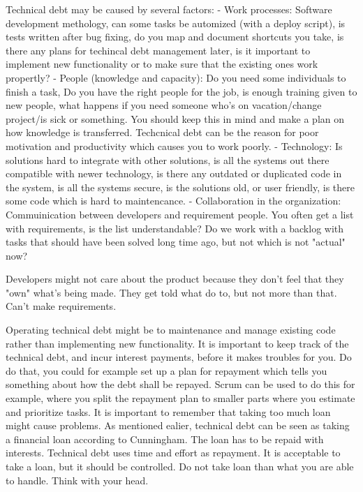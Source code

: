 Technical debt may be caused by several factors:
- Work processes: Software development methology, can some tasks be automized (with a deploy script), is tests written after bug fixing, do you map and document shortcuts you take, is there any plans for techincal debt management later, is it important to implement new functionality or to make sure that the existing ones work propertly?
- People (knowledge and capacity): Do you need some individuals to finish a task, Do you have the right people for the job, is enough training given to new people, what happens if you need someone who's on vacation/change project/is sick or something. You should keep this in mind and make a plan on how knowledge is transferred. Techcnical debt can be the reason for poor motivation and productivity which causes you to work poorly. 
- Technology: Is solutions hard to integrate with other solutions, is all the systems out there compatible with newer technology, is there any outdated or duplicated code in the system, is all the systems secure, is the solutions old, or user friendly, is there some code which is hard to maintencance. 
- Collaboration in the organization: Commuinication between developers and requirement people. You often get a list with requirements, is the list understandable? Do we work with a backlog with tasks that should have been solved long time ago, but not which is not "actual" now?

Developers might not care about the product because they don't feel that they "own" what's being made. They get told what do to, but not more than that. Can't make requirements.


Operating technical debt might be to maintenance and manage existing code rather than implementing new functionality. It is important to keep track of the technical debt, and incur interest payments, before it makes troubles for you. Do do that, you could for example set up a plan for repayment which tells you something about how the debt shall be repayed. Scrum can be used to do this for example, where you split the repayment plan to smaller parts where you estimate and prioritize tasks. It is important to remember that taking too much loan might cause problems. As mentioned ealier, technical debt can be seen as taking a financial loan according to Cunningham. The loan has to be repaid with interests. Technical debt uses time and effort as repayment. It is acceptable to take a loan, but it should be controlled. Do not take loan than what you are able to handle. Think with your head.

